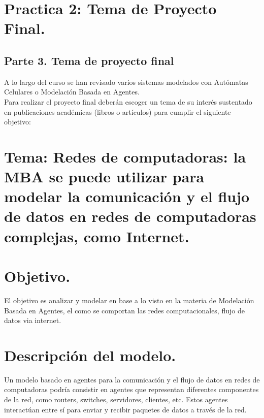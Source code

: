 \documentclass[12pt]{article}
\begin{document}

{\color{red} \section*{Practica 2: Tema de Proyecto Final.}}


{\color{blue} \subsection*{Parte 3. Tema de proyecto final }}
\vspace{1em}

A lo largo del curso se han revisado varios sistemas modelados con Autómatas Celulares o Modelación Basada en Agentes.\\

Para realizar el proyecto final deberán escoger un tema de su interés sustentado en publicaciones académicas (libros o artículos) para
cumplir el siguiente objetivo:\\

{\color{red} \section*{Tema: Redes de computadoras: la MBA se puede utilizar para modelar la comunicación y el flujo de datos en redes de computadoras complejas, como Internet.}}

{\color{red} \section*{Objetivo.}}

El objetivo es analizar y modelar en base a lo visto en la materia de Modelación Basada en Agentes, el como se comportan las redes computacionales, flujo de datos via internet.

{\color{red} \section*{Descripción del modelo.}}

Un modelo basado en agentes para la comunicación y el flujo de datos en redes de computadoras podría consistir en agentes que representan diferentes componentes de la red, como routers, switches, servidores, clientes, etc. Estos agentes interactúan entre sí para enviar y recibir paquetes de datos a través de la red.\\
\end{document}
